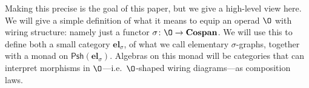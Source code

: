 \documentclass[11pt, article, oneside]{memoir}
\theoremstyle{plain}
\theoremstyle{definition}
\theoremstyle{remark}
\newcommand{\Cat}[1]{\mathbf{#1}}
\newcommand{\Fun}[1]{\mathsf{#1}}
\DeclareMathOperator{\id}{id}
\newcommand{\Psh}{\Fun{Psh}}
\newcommand{\Cospan}{\Cat{Cospan}}
\newcommand{\stodo}[2][]{\todo[color=red!30, #1]{#2}}
\newcommand\elGr{\Cat{elGr}}
\newcommand\el{\Cat{el}}
\newcommand\stick{\shortmid}
\begin{document}
Making this precise is the goal of this paper, but we give a high-level view here. We will give a simple definition of what it means to equip an operad $\O$ with wiring structure: namely just a functor $\sigma\colon\O\to\Cospan$. We will use this to define both a small category $\el_\sigma$, of what we call elementary $\sigma$-graphs, together with a monad on $\Psh(\el_\sigma)$. Algebras on this monad will be categories that can interpret morphisms in $\O$---i.e.\ $\O$-shaped wiring diagrams---as composition laws.


%
 

%
%
%
%
\end{document}
